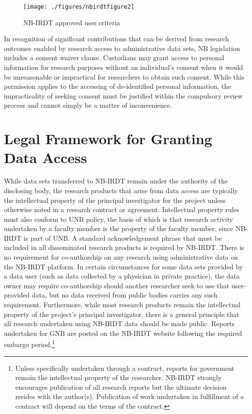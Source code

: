 \begin{figure}
\texttt{[image: ./figures/nbirdtfigure2]} \caption{NB-IRDT approved user criteria}\label{fig:nbirdtfigure2}
\end{figure}

In recognition of significant contributions that can be derived from research outcomes enabled by research access to administrative data sets, NB legislation includes a consent waiver clause. Custodians may grant access to personal information for research purposes without an individual's consent when it would be unreasonable or impractical for researchers to obtain such consent. While this permission applies to the accessing of de-identified personal information, the impracticality of seeking consent must be justified within the compulsory review process and cannot simply be a matter of inconvenience.

\hypertarget{nbirdt-legalaccess}{%
\section{Legal Framework for Granting Data Access}\label{nbirdt-legalaccess}}

While data sets transferred to NB-IRDT remain under the authority of the disclosing body, the research products that arise from data access are typically the intellectual property of the principal investigator for the project unless otherwise noted in a research contract or agreement. Intellectual property rules must also conform to UNB policy, the basis of which is that research activity undertaken by a faculty member is the property of the faculty member, since NB-IRDT is part of UNB. A standard acknowledgement phrase that must be included in all disseminated research products is required by NB-IRDT. There is no requirement for co-authorship on any research using administrative data on the NB-IRDT platform. In certain circumstances for some data sets provided by a data user (such as data collected by a physician in private practice), the data owner may require co-authorship should another researcher seek to use that user-provided data, but no data received from public bodies carries any such requirement. Furthermore, while most research products remain the intellectual property of the project's principal investigator, there is a general principle that all research undertaken using NB-IRDT data should be made public. Reports undertaken for GNB are posted on the NB-IRDT website following the required embargo period.\footnote{Unless specifically undertaken through a contract, reports for government remain the intellectual property of the researcher. NB-IRDT strongly encourages publication of all research reports but the ultimate decision resides with the author(s). Publication of work undertaken in fulfillment of a contract will depend on the terms of the contract.}

